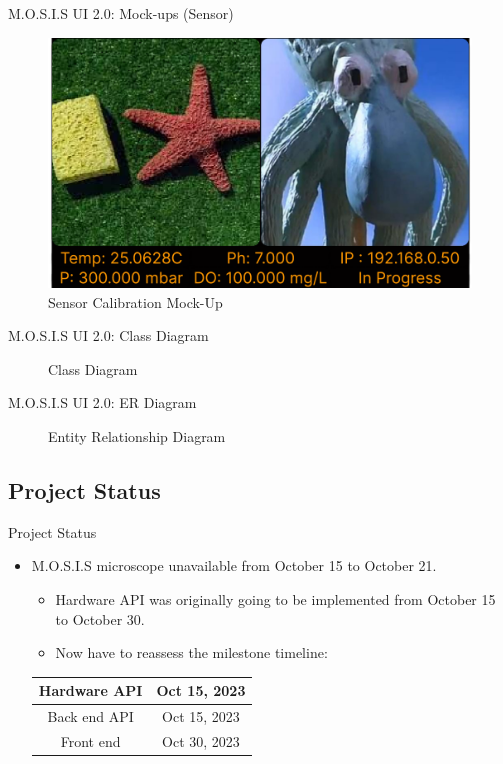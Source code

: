 \documentclass[17pt, aspectratio=169]{beamer}
\begin{document}
\begin{frame}{M.O.S.I.S UI 2.0: Mock-ups (Sensor)}
	\begin{figure}
		\includegraphics[page=7,height=0.65\textheight]{../../Progress_Report_Document/Appendix/Design_Documentation/User_Interface/Figures/M.O.S.I.S_UI_Design.pdf}
		\caption{Sensor Calibration Mock-Up}
	\end{figure}
\end{frame}
\begin{frame}{M.O.S.I.S UI 2.0: Class Diagram}
	\begin{figure}
		\caption{Class Diagram}
	\end{figure}
\end{frame}
\begin{frame}{M.O.S.I.S UI 2.0: ER Diagram}
	\begin{figure}
		\caption{Entity Relationship Diagram}
	\end{figure}
\end{frame}
\subsection{Project Status}
\begin{frame}{Project Status}
	\begin{itemize}
		\item M.O.S.I.S microscope unavailable from October 15 to October 21.
		      \begin{itemize}
			      \item Hardware API was originally going to be implemented from October 15 to October 30.
			      \item Now have to reassess the milestone timeline:
		      \end{itemize}
		      \begin{center}
			      \begin{tabular}{||c | c||}
				      \hline
				      Hardware API & Oct 15, 2023 \\
				      \hline
				      Back end API & Oct 15, 2023 \\
				      \hline
				      Front end    & Oct 30, 2023 \\
				      \hline
			      \end{tabular}
		      \end{center}
	\end{itemize}
\end{frame}
\end{document}
